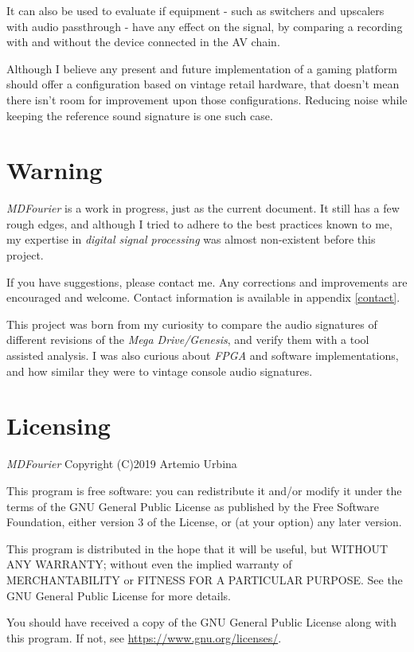 \documentclass[10pt,a4paper]{report}
\begin{document}
It can also be used to evaluate if equipment - such as switchers and upscalers with audio passthrough - have any effect on the signal, by comparing a recording with and without the device connected in the AV chain.

Although I believe any present and future implementation of a gaming platform should offer a configuration based on vintage retail hardware, that doesn't mean there isn't room for improvement upon those configurations. Reducing noise while keeping the reference sound signature is one such case.

\section{Warning}

\textit{MDFourier} is a work in progress, just as the current document. It still has a few rough edges, and although I tried to adhere to the best practices known to me, my expertise in \textit{digital signal processing} was almost non-existent before this project. 

If you have suggestions, please contact me. Any corrections and improvements are encouraged and welcome. Contact information is available in appendix \ref{contact}.

This project was born from my curiosity to compare the audio signatures of different revisions of the  \textit{Mega Drive/Genesis}, and verify them with a tool assisted analysis. I was also curious about \textit{FPGA} and software implementations, and how similar they were to vintage console audio signatures.

\section{Licensing}

\textit{MDFourier} Copyright (C)2019 Artemio Urbina

This program is free software: you can redistribute it and/or modify
it under the terms of the GNU General Public License as published by
the Free Software Foundation, either version 3 of the License, or
(at your option) any later version.

This program is distributed in the hope that it will be useful,
but WITHOUT ANY WARRANTY; without even the implied warranty of
MERCHANTABILITY or FITNESS FOR A PARTICULAR PURPOSE.  See the
GNU General Public License for more details.

You should have received a copy of the GNU General Public License
along with this program.  If not, see \url{https://www.gnu.org/licenses/}.
\end{document}
